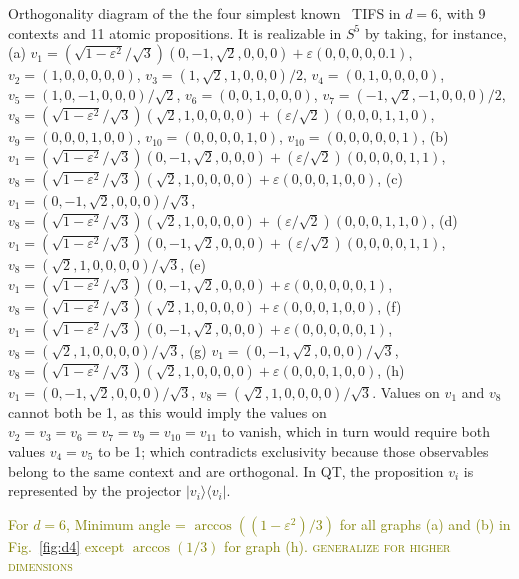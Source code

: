 \documentclass[%
  twocolumn,
 showpacs,
 showkeys,
 preprintnumbers,
 amsmath,amssymb,
 aps,
  pra,
  longbibliography,
 floatfix,
 ]{revtex4-1}
\newcommand{\meil}[1]{\textcolor{olive}{#1}}
\begin{document}
Orthogonality diagram of the  the four  simplest known~\cite{}
TIFS  in $d=6$, with 9 contexts and 11 atomic propositions.
It is realizable in  $S^5$ by taking,
for instance,
(a)
$v_1     =  (\sqrt{1-\varepsilon^2} / \sqrt{3})(  {0,-1,\sqrt{2},0,0,0}  )+\varepsilon({0,0,0,0,0.1})$,
$v_2     = (  {1,0,0,0,0,0}    )$,
$v_3     = (  {1,\sqrt{2},1,0,0,0}   )/ 2 $,
$v_4     = (  {0,1,0,0,0,0}    ) $,
$v_5     = (  {1,0,-1,0,0,0}     )/\sqrt{2}$,
$v_6     = (  {0,0,1,0,0,0}     ) $,
$v_7   = (     {-1,\sqrt{2},-1,0,0,0} )/ 2$,
$v_8   =      (\sqrt{1-\varepsilon^2} / \sqrt{3})  ({\sqrt{2},1,0,0,0,0})+(\varepsilon/\sqrt{2})({0,0,0,1,1,0})$,
$v_9     = (   {0,0,0,1,0,0} )$,
$v_{10}     = (   {0,0,0,0,1,0} )$,
$v_{10}     = (   {0,0,0,0,0,1} )$,
(b)
$v_1   =  (\sqrt{1-\varepsilon^2} / \sqrt{3})  ({0,-1,\sqrt{2},0,0,0})+(\varepsilon/\sqrt{2})({0,0,0,0,1,1})$,
$v_8   =  (\sqrt{1-\varepsilon^2} / \sqrt{3})  ( {\sqrt{2},1,0,0,0,0})+\varepsilon({0,0,0,1,0,0})$,
(c)
$v_1   = ({0,-1,\sqrt{2},0,0,0})/ \sqrt{3}$,
$v_8   =  (\sqrt{1-\varepsilon^2} / \sqrt{3})  ( {\sqrt{2},1,0,0,0,0})+(\varepsilon/\sqrt{2})({0,0,0,1,1,0})$,
(d)
$v_1   =  (\sqrt{1-\varepsilon^2} / \sqrt{3})  ({0,-1,\sqrt{2},0,0,0})+(\varepsilon/\sqrt{2})({0,0,0,0,1,1})$,
$v_8   =  ( {\sqrt{2},1,0,0,0,0})/ \sqrt{3}$,
(e)
$v_1   =  (\sqrt{1-\varepsilon^2} / \sqrt{3})  ({0,-1,\sqrt{2},0,0,0})+\varepsilon({0,0,0,0,0,1})$,
$v_8   =  (\sqrt{1-\varepsilon^2} / \sqrt{3})  ( {\sqrt{2},1,0,0,0,0})+\varepsilon({0,0,0,1,0,0})$,
(f)
$v_1   =  (\sqrt{1-\varepsilon^2} / \sqrt{3})  ({0,-1,\sqrt{2},0,0,0})+\varepsilon({0,0,0,0,0,1})$,
$v_8   =  ( {\sqrt{2},1,0,0,0,0})/ \sqrt{3}$,
(g)
$v_1   = ({0,-1,\sqrt{2},0,0,0})/ \sqrt{3}$,
$v_8   =  (\sqrt{1-\varepsilon^2} / \sqrt{3})  ( {\sqrt{2},1,0,0,0,0})+\varepsilon({0,0,0,1,0,0})$,
(h)
$v_1   = ({0,-1,\sqrt{2},0,0,0})/ \sqrt{3}$,
$v_8   =  ( {\sqrt{2},1,0,0,0,0})/ \sqrt{3}$.
Values on $v_1$ and $v_8$ cannot both be 1, as this would imply the values on $v_2=v_3=v_6=v_7=v_9=v_{10}=v_{11}$ to vanish,
which in turn would require both values $v_4=v_5$ to be 1; which contradicts exclusivity
because those observables belong to the same context and are orthogonal.
In QT, the proposition $v_i$ is represented by the projector $| v_i \rangle\langle v_i |$.

\meil{For $d=6$, Minimum angle = $\arccos((1-\varepsilon^2)/3)$ for all graphs (a) and (b) in Fig.~\ref{fig:d4} except $\arccos(1/3)$ for graph (h).
\textsc{generalize for higher dimensions}}
\end{document}
